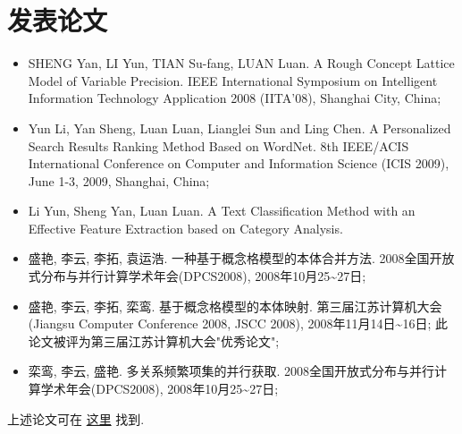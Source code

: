 \documentclass[a4paper,10pt,english]{manual}
\begin{document}
\section{发表论文}
\begin{itemize}
\item {} 
SHENG Yan, LI Yun, TIAN Su-fang, LUAN Luan. A Rough Concept Lattice Model of Variable Precision. IEEE International Symposium on Intelligent Information Technology Application 2008 (IITA'08), Shanghai City, China;

\item {} 
Yun Li, Yan Sheng, Luan Luan, Lianglei Sun and Ling Chen. A Personalized Search Results Ranking Method Based on WordNet. 8th IEEE/ACIS International Conference on Computer and Information Science (ICIS 2009), June 1-3, 2009, Shanghai, China;

\item {} 
Li Yun, Sheng Yan, Luan Luan. A Text Classification Method with an Effective Feature Extraction based on Category Analysis.

\item {} 
盛艳, 李云, 李拓, 袁运浩. 一种基于概念格模型的本体合并方法. 2008全国开放式分布与并行计算学术年会(DPCS2008), 2008年10月25\textasciitilde{}27日;

\item {} 
盛艳, 李云, 李拓, 栾鸾. 基于概念格模型的本体映射. 第三届江苏计算机大会(Jiangsu Computer Conference 2008, JSCC 2008), 2008年11月14日\textasciitilde{}16日; 此论文被评为第三届江苏计算机大会"优秀论文";

\item {} 
栾鸾, 李云, 盛艳. 多关系频繁项集的并行获取. 2008全国开放式分布与并行计算学术年会(DPCS2008), 2008年10月25\textasciitilde{}27日;

\end{itemize}

上述论文可在 \href{http://github.com/lizzie/lizworkspace/tree/cb82ad8d84a1b1a12df80e3508e3629abf09ac83/paper}{这里} 找到.
\end{document}
